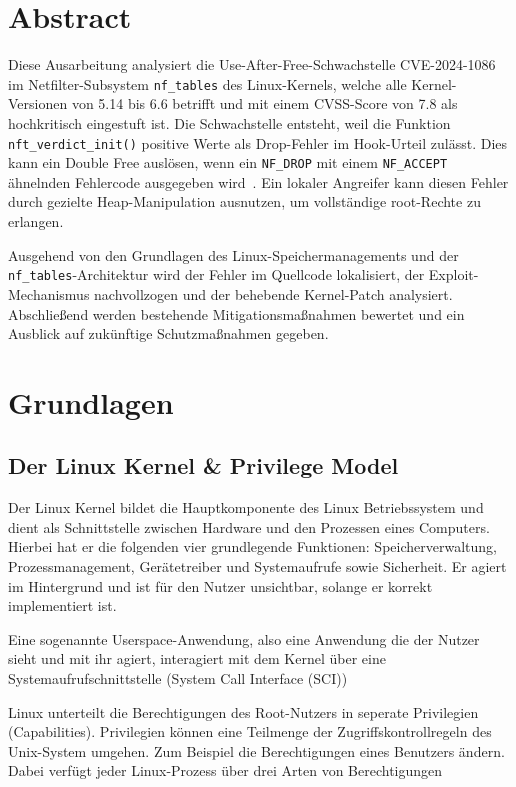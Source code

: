 \documentclass[12pt]{article}
\begin{document}
\section{Abstract}
Diese Ausarbeitung analysiert die Use-After-Free-Schwachstelle CVE-2024-1086 
im Netfilter-Subsystem \texttt{nf\_tables} des Linux-Kernels, welche alle 
Kernel-Versionen von 5.14 bis 6.6 betrifft und mit einem CVSS-Score von 7.8 
als hochkritisch eingestuft ist. Die Schwachstelle entsteht, weil die Funktion 
\texttt{nft\_verdict\_init()} positive Werte als Drop-Fehler im Hook-Urteil 
zulässt. Dies kann ein Double Free auslösen, wenn ein \texttt{NF\_DROP} mit 
einem \texttt{NF\_ACCEPT} ähnelnden Fehlercode ausgegeben wird~\cite{suse}. 
Ein lokaler Angreifer kann diesen Fehler durch gezielte Heap-Manipulation 
ausnutzen, um vollständige root-Rechte zu erlangen.

Ausgehend von den Grundlagen des Linux-Speichermanagements und der 
\texttt{nf\_tables}-Architektur wird der Fehler im Quellcode lokalisiert, der 
Exploit-Mechanismus nachvollzogen und der behebende Kernel-Patch analysiert. 
Abschließend werden bestehende Mitigationsmaßnahmen bewertet und ein Ausblick 
auf zukünftige Schutzmaßnahmen gegeben.
	\section{Grundlagen}
  \subsection{Der Linux Kernel \& Privilege Model}
  Der Linux Kernel bildet die Hauptkomponente des Linux Betriebssystem und dient als Schnittstelle zwischen Hardware und den Prozessen eines Computers.
  Hierbei hat er die folgenden vier grundlegende Funktionen: Speicherverwaltung, Prozessmanagement, Gerätetreiber und Systemaufrufe sowie Sicherheit. 
  Er agiert im Hintergrund und ist für den Nutzer unsichtbar, solange er korrekt implementiert ist. 
\cite{redhat}

  Eine sogenannte Userspace-Anwendung, also eine Anwendung die der Nutzer sieht und mit ihr agiert, interagiert mit dem Kernel über eine Systemaufrufschnittstelle (System Call Interface (SCI))
\cite{redhat}

Linux unterteilt die Berechtigungen des Root-Nutzers in seperate Privilegien (Capabilities). Privilegien können eine Teilmenge der Zugriffskontrollregeln des Unix-System umgehen.
Zum Beispiel die Berechtigungen eines Benutzers ändern.
Dabei verfügt jeder Linux-Prozess über drei Arten von Berechtigungen 
\end{document}
